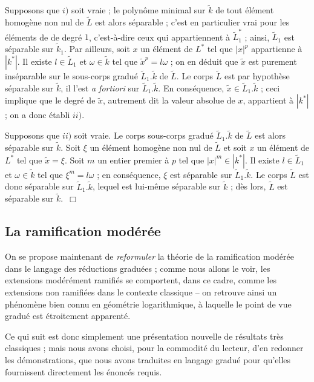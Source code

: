 \documentclass[10pt,leqno]{article}
\newcommand{\red}{\widetilde}
\begin{document}
\medskip
Supposons que $i)$ soit vraie ; le polynôme minimal sur $\red{k}$ de tout élément homogène non nul de $\red{L}$ est alors séparable ; c'est en particulier vrai pour les éléments de de degré $1$, c'est-à-dire ceux qui appartiennent à $\red{L}_1^{*}$ ; ainsi, $\red{L}_1$ est séparable sur $\red{k}_1$. Par ailleurs, soit $x$ un élément de $L^{*}$ tel que $|x|^{p}$ appartienne à $|k^{*}|$. Il existe $l\in\red{L}_1$ et $\omega\in \red{k}$ tel que $\red{x}^{p}=l\omega$ ; on en déduit que $\red{x}$ est purement inséparable sur le sous-corps gradué $\red{L}_1.\red{k}$ de $\red{L}$. Le corps $\red{L}$ est par hypothèse séparable sur $\red{k}$, il l'est {\em a fortiori} sur $\red{L}_1.\red{k}$. En conséquence, $\red{x}\in \red{L}_1.\red{k}$ ; ceci implique que le degré de $\red{x}$, autrement dit la valeur absolue de $x$, appartient à $|k^{*}|$ ; on a donc établi $ii)$. 

\medskip
Supposons que $ii)$ soit vraie. Le corps sous-corps gradué $\red{L}_1.\red{k}$ de $\red{L}$ est alors séparable sur $\red{k}$. Soit $\xi$ un élément homogène non nul de $\red{L}$ et soit $x$ un élément de $L^{*}$ tel que $\red{x}=\xi$. Soit $m$ un entier premier à $p$ tel que $|x|^{m}\in |k^{*}|$. Il existe $l\in \red{L}_1$ et $\omega\in \red{k}$ tel que $\xi^{m}=l\omega$ ; en conséquence, $\xi$ est séparable sur $\red{L}_1.\red{k}$. Le corps $\red{L}$ est donc séparable sur $\red{L}_1.\red{k}$, lequel est lui-même séparable sur $\red{k}$ ; dès lors, $\red{L}$ est séparable sur $\red{k}$.~$\Box$ 




\subsection*{La ramification modérée}

\medskip
On se propose maintenant de {\em reformuler} la théorie de la ramification modérée dans le langage des réductions graduées ; comme nous allons le voir, les extensions modérément ramifiés se comportent, dans ce cadre, comme les extensions non ramifiées dans le contexte classique -- on retrouve ainsi un phénomène bien connu en géométrie logarithmique, à laquelle le point de vue gradué est étroitement apparenté. 

\medskip
Ce qui suit est donc simplement une présentation nouvelle de résultats très classiques ; mais nous avons choisi, pour la commodité du lecteur, d'en redonner les démonstrations, que nous avons traduites en langage gradué pour qu'elles fournissent directement les énoncés requis. 
\end{document}
